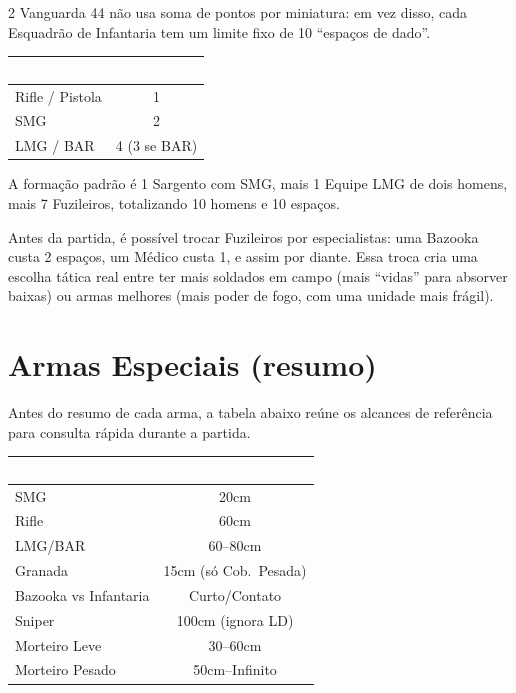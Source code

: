 \documentclass[10pt]{article}
\begin{document}
\begin{multicols}{2}
Vanguarda 44 não usa soma de pontos por miniatura: em vez disso, cada Esquadrão de Infantaria tem um limite fixo de 10 ``espaços de dado''.

\begin{center}
\footnotesize
\setlength{\tabcolsep}{3pt}
\begin{tabular}{@{}lc@{}}
\toprule
\rowcolor{vinho}
\textcolor{white}{\textbf{Arma}} & \textcolor{white}{\textbf{Espaços}} \\
\midrule
Rifle / Pistola & 1 \\
SMG & 2 \\
LMG / BAR & 4 (3 se BAR) \\
\bottomrule
\end{tabular}
\end{center}

A formação padrão é 1 Sargento com SMG, mais 1 Equipe LMG de dois homens, mais 7 Fuzileiros, totalizando 10 homens e 10 espaços.

Antes da partida, é possível trocar Fuzileiros por especialistas: uma Bazooka custa 2 espaços, um Médico custa 1, e assim por diante. Essa troca cria uma escolha tática real entre ter mais soldados em campo (mais ``vidas'' para absorver baixas) ou armas melhores (mais poder de fogo, com uma unidade mais frágil).

\section{Armas Especiais (resumo)}

Antes do resumo de cada arma, a tabela abaixo reúne os alcances de referência para consulta rápida durante a partida.

\begin{center}
\footnotesize
\setlength{\tabcolsep}{3pt}
\begin{tabular}{@{}lc@{}}
\toprule
\rowcolor{vinho}
\textcolor{white}{\textbf{Arma}} & \textcolor{white}{\textbf{Alcance}} \\
\midrule
SMG & 20cm \\
Rifle & 60cm \\
LMG/BAR & 60--80cm \\
Granada & 15cm (só Cob.\ Pesada) \\
Bazooka vs Infantaria & Curto/Contato \\
Sniper & 100cm (ignora LD) \\
Morteiro Leve & 30--60cm \\
Morteiro Pesado & 50cm--Infinito \\
\bottomrule
\end{tabular}
\end{center}


\end{multicols}
\end{document}

